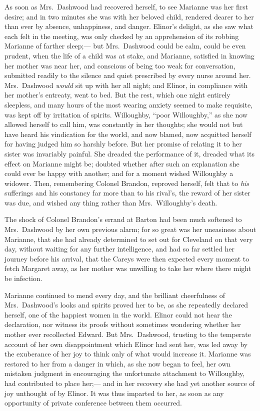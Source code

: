 \documentclass{article}
\begin{document}
As soon as Mrs.\ Dashwood had recovered herself,
to see Marianne was her first desire; and in two minutes she
was with her beloved child, rendered dearer to her than ever
by absence, unhappiness, and danger.  Elinor's delight,
as she saw what each felt in the meeting, was only checked
by an apprehension of its robbing Marianne of farther sleep;---%
but Mrs.\ Dashwood could be calm, could be even prudent,
when the life of a child was at stake, and Marianne,
satisfied in knowing her mother was near her, and conscious
of being too weak for conversation, submitted readily to the
silence and quiet prescribed by every nurse around her.
Mrs.\ Dashwood \emph{would} sit up with her all night; and Elinor,
in compliance with her mother's entreaty, went to bed.
But the rest, which one night entirely sleepless,
and many hours of the most wearing anxiety seemed to
make requisite, was kept off by irritation of spirits.
Willoughby, ``poor Willoughby,'' as she now allowed
herself to call him, was constantly in her thoughts; she
would not but have heard his vindication for the world,
and now blamed, now acquitted herself for having judged him
so harshly before.  But her promise of relating it to her
sister was invariably painful.  She dreaded the performance
of it, dreaded what its effect on Marianne might be;
doubted whether after such an explanation she could ever
be happy with another; and for a moment wished Willoughby
a widower.  Then, remembering Colonel Brandon, reproved herself,
felt that to \emph{his} sufferings and his constancy far more
than to his rival's, the reward of her sister was due,
and wished any thing rather than Mrs.\ Willoughby's death.

The shock of Colonel Brandon's errand at Barton had been
much softened to Mrs.\ Dashwood by her own previous alarm;
for so great was her uneasiness about Marianne, that she
had already determined to set out for Cleveland on that
very day, without waiting for any further intelligence,
and had so far settled her journey before his arrival,
that the Careys were then expected every moment to fetch
Margaret away, as her mother was unwilling to take her
where there might be infection.

Marianne continued to mend every day, and the brilliant
cheerfulness of Mrs.\ Dashwood's looks and spirits proved
her to be, as she repeatedly declared herself, one of
the happiest women in the world.  Elinor could not hear
the declaration, nor witness its proofs without sometimes
wondering whether her mother ever recollected Edward.
But Mrs.\ Dashwood, trusting to the temperate account
of her own disappointment which Elinor had sent her,
was led away by the exuberance of her joy to think only
of what would increase it.  Marianne was restored to her
from a danger in which, as she now began to feel,
her own mistaken judgment in encouraging the unfortunate
attachment to Willoughby, had contributed to place her;---%
and in her recovery she had yet another source of joy
unthought of by Elinor.  It was thus imparted to her,
as soon as any opportunity of private conference
between them occurred.
\end{document}

